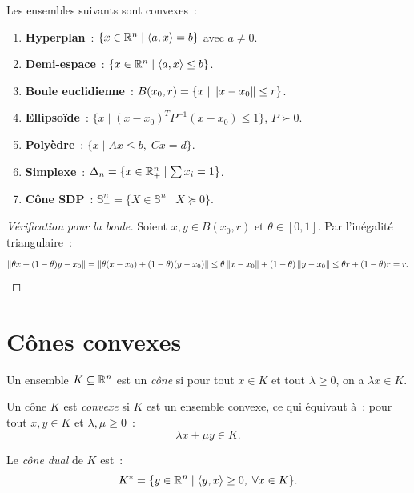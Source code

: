 \begin{exemple}
Les ensembles suivants sont convexes~:
\begin{enumerate}
    \item \textbf{Hyperplan}~: $\{x \in \mathbb{R}^n \mid \langle a, x \rangle = b\}$ avec $a \neq 0$.
    \item \textbf{Demi-espace}~: $\{x \in \mathbb{R}^n \mid \langle a, x \rangle \leq b\}$.
    \item \textbf{Boule euclidienne}~: $B(x_0, r) = \{x \mid \left\| x - x_0 \right\| \leq r\}$.
    \item \textbf{Ellipso\"ide}~: $\{x \mid (x-x_0)^T P^{-1}(x-x_0) \leq 1\}$, $P \succ 0$.
    \item \textbf{Poly\`edre}~: $\{x \mid Ax \leq b, \; Cx = d\}$.
    \item \textbf{Simplexe}~: $\Delta_n = \{x \in \mathbb{R}^n_+ \mid \sum x_i = 1\}$.
    \item \textbf{C\^one SDP}~: $\mathbb{S}^n_+ = \{X \in \mathbb{S}^n \mid X \succeq 0\}$.
\end{enumerate}
\end{exemple}

\begin{proof}[V\'erification pour la boule]
Soient $x, y \in B(x_0, r)$ et $\theta \in [0,1]$. Par l'in\'egalit\'e triangulaire~:
\[
    \left\| \theta x + (1-\theta)y - x_0 \right\|
    = \left\| \theta(x-x_0) + (1-\theta)(y-x_0) \right\|
    \leq \theta\left\| x-x_0 \right\| + (1-\theta)\left\| y-x_0 \right\|
    \leq \theta r + (1-\theta)r = r.
\]
\end{proof}

\section{C\^ones convexes}

\begin{definition}[C\^one]
Un ensemble $K \subseteq \mathbb{R}^n$ est un \emph{c\^one} si pour tout $x \in K$ et tout
$\lambda \geq 0$, on a $\lambda x \in K$.
\end{definition}

\begin{definition}
Un c\^one $K$ est \emph{convexe} si $K$ est un ensemble convexe, ce qui \'equivaut \`a~:
pour tout $x, y \in K$ et $\lambda, \mu \geq 0$~:
\[
    \lambda x + \mu y \in K.
\]
\end{definition}

\begin{definition}
Le \emph{c\^one dual} de $K$ est~:
\[
    K^* = \{y \in \mathbb{R}^n \mid \langle y, x \rangle \geq 0, \; \forall x \in K\}.
\]
\end{definition}

